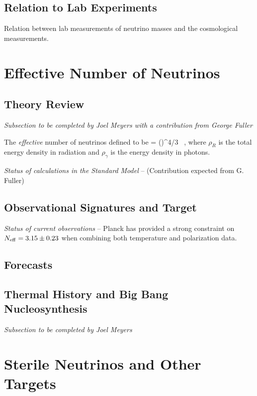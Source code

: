 \subsection{Relation to Lab Experiments}

Relation between lab measurements of neutrino masses and the cosmological measurements.

\section{Effective Number of Neutrinos}

\subsection{Theory Review}

{\it Subsection to be completed by Joel Meyers with a contribution from George Fuller}

The {\it effective} number of neutrinos defined to be
\beq
\Neff= \left(\right)^{4/3}   \ ,
\eeq
where $\rho_{R}$ is the total energy density in radiation and $\rho_\gamma$ is the energy density in photons. 

{\it Status of calculations in the Standard Model} -- (Contribution expected from G. Fuller)


\subsection{Observational Signatures and Target}

{\it Status of current observations} -- Planck has provided a strong constraint on $N_{\rm eff} = 3.15 \pm 0.23$ when combining both temperature and polarization data.  

\subsection{Forecasts}

\subsection{Thermal History and Big Bang Nucleosynthesis}

{\it Subsection to be completed by Joel Meyers}



\section{Sterile Neutrinos and Other Targets}
